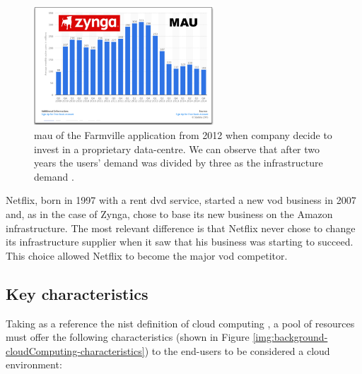 \begin{figure}
	\centering{}
	\includegraphics[width=0.6\textwidth]{chapters/background/images/zynga-case.png}
	\caption[\acs{mau} of Farmville application after 2012]{\acf{mau} of the Farmville application from
		2012 when company decide to invest in a proprietary data-centre. We can observe that after two
		years the users' demand was divided by three as the infrastructure demand \cite{netflixZynga}.}
	\label{img:background-capexOpex-zyngaCase}
\end{figure}

Netflix, born in 1997 with a rent \acs{dvd} service, started a new \ac{vod} business in 2007 and, as
in the case of Zynga, chose to base its new business on the Amazon infrastructure. The most relevant
difference is that Netflix never chose to change its infrastructure supplier when it saw that his
business was starting to succeed. This choice allowed Netflix to become the major \ac{vod} competitor.

\subsection{Key characteristics}
\label{sec:background-cloudComputing-characteristics}
Taking as a reference the \ac{nist} definition of cloud computing \cite{nistCloudComputing}, a pool of resources
must offer the following characteristics (shown in Figure \ref{img:background-cloudComputing-characteristics})
to the end-users to be considered a cloud environment:

